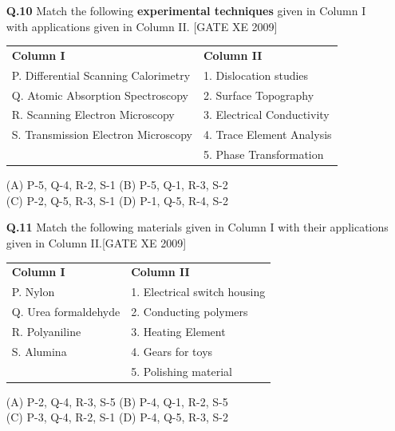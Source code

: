 \documentclass[journal,12pt,onecolumn]{IEEEtran}
\theoremstyle{remark}
\begin{document}
\begin{enumerate}
\begin{enumerate}
\vspace{2em}

\item[\textbf{Q.10}] Match the following \textbf{experimental techniques} given in Column I with applications given in Column II.
\hfill[GATE XE 2009]
\vspace{1em}

\begin{tabular}{p{7cm} p{6cm}}
\textbf{Column I} & \textbf{Column II} \\
P. Differential Scanning Calorimetry & 1. Dislocation studies \\
Q. Atomic Absorption Spectroscopy & 2. Surface Topography \\
R. Scanning Electron Microscopy & 3. Electrical Conductivity \\
S. Transmission Electron Microscopy & 4. Trace Element Analysis \\
& 5. Phase Transformation \\
\end{tabular}

\vspace{1em}

\noindent
(A) P-5, Q-4, R-2, S-1 \quad
(B) P-5, Q-1, R-3, S-2 \\
(C) P-2, Q-5, R-3, S-1 \quad
(D) P-1, Q-5, R-4, S-2
\item[\textbf{Q.11}] Match the following materials given in Column I with their applications given in Column II.\hfill[GATE XE 2009]

\vspace{1em}

\begin{tabular}{p{6cm} p{6cm}}
\textbf{Column I} & \textbf{Column II} \\
P. Nylon & 1. Electrical switch housing \\
Q. Urea formaldehyde & 2. Conducting polymers \\
R. Polyaniline & 3. Heating Element \\
S. Alumina & 4. Gears for toys \\
& 5. Polishing material \\
\end{tabular}

\vspace{1em}

\noindent
(A) P-2, Q-4, R-3, S-5 \hfill
(B) P-4, Q-1, R-2, S-5 \\
(C) P-3, Q-4, R-2, S-1 \hfill
(D) P-4, Q-5, R-3, S-2


\end{enumerate}
\end{enumerate}
\end{document}
